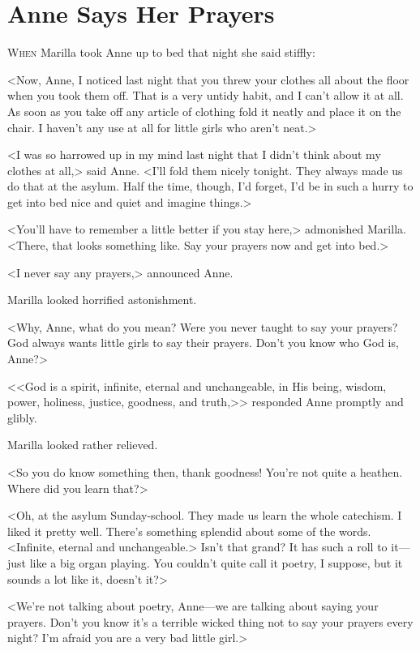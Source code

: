 \chapter{Anne Says Her Prayers}

\lettrine[]{W}{hen} Marilla took Anne up to bed that night she said stiffly:

\zz
<Now, Anne, I noticed last night that you threw your clothes all about the floor when you took them off. That is a very untidy habit, and I can't allow it at all. As soon as you take off any article of clothing fold it neatly and place it on the chair. I haven't any use at all for little girls who aren't neat.>

<I was so harrowed up in my mind last night that I didn't think about my clothes at all,> said Anne. <I'll fold them nicely tonight. They always made us do that at the asylum. Half the time, though, I'd forget, I'd be in such a hurry to get into bed nice and quiet and imagine things.>

<You'll have to remember a little better if you stay here,> admonished Marilla. <There, that looks something like. Say your prayers now and get into bed.>

<I never say any prayers,> announced Anne.

Marilla looked horrified astonishment.

<Why, Anne, what do you mean? Were you never taught to say your prayers? God always wants little girls to say their prayers. Don't you know who God is, Anne?>

<<God is a spirit, infinite, eternal and unchangeable, in His being, wisdom, power, holiness, justice, goodness, and truth,>> responded Anne promptly and glibly.

Marilla looked rather relieved.

<So you do know something then, thank goodness! You're not quite a heathen. Where did you learn that?>

<Oh, at the asylum Sunday-school. They made us learn the whole catechism. I liked it pretty well. There's something splendid about some of the words. <Infinite, eternal and unchangeable.> Isn't that grand? It has such a roll to it—just like a big organ playing. You couldn't quite call it poetry, I suppose, but it sounds a lot like it, doesn't it?>

<We're not talking about poetry, Anne—we are talking about saying your prayers. Don't you know it's a terrible wicked thing not to say your prayers every night? I'm afraid you are a very bad little girl.>

